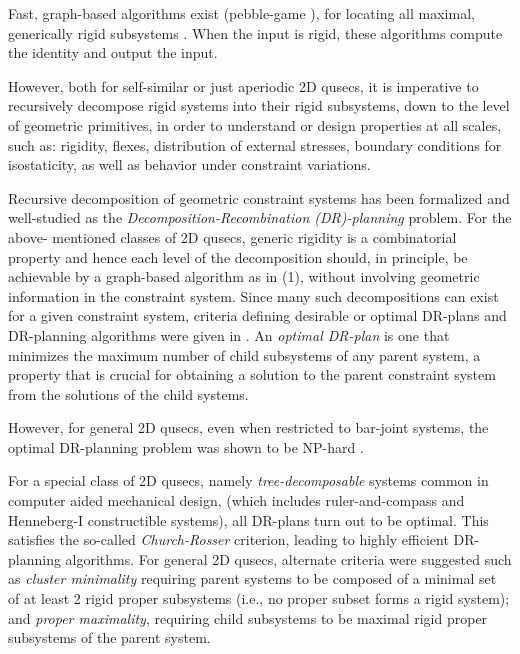 Fast, graph-based algorithms exist (pebble-game \cite{XX}), for
locating all maximal, generically rigid subsystems \cite{XX}. When the
input is rigid, these algorithms compute the identity and  output the
input.

However, both for self-similar or just aperiodic 2D qusecs, it is
imperative to recursively decompose rigid systems into their rigid
subsystems, down to the level of geometric primitives, in order to
understand or design properties at all scales, such as: rigidity,
flexes, distribution of external stresses, boundary conditions for
isostaticity, as well as behavior under constraint variations.

Recursive decomposition of geometric constraint systems has been
formalized \cite{XX} and well-studied \cite{XX} as the {\sl
Decomposition-Recombination (DR)-planning} problem. For the above-
mentioned classes of 2D qusecs, generic rigidity is a combinatorial
property and hence each level of the decomposition should, in
principle, be achievable by a graph-based algorithm as in (1), without
involving geometric information in the constraint system. Since many
such decompositions can exist for a given constraint system, criteria
defining desirable or optimal DR-plans and DR-planning algorithms were
given in \cite{XX}. An {\em optimal DR-plan} is one that minimizes the
maximum number of child subsystems of any parent system, a property
that is crucial for obtaining a solution to the parent constraint
system from the solutions of the child systems.

However, for general 2D qusecs, even when restricted to bar-joint
systems, the optimal DR-planning problem was shown to be NP-hard
\cite{XX}.

For a special class of 2D qusecs, namely  {\em tree-decomposable}
systems \cite{XX} common in computer aided mechanical design, (which
includes ruler-and-compass and Henneberg-I constructible systems), all
DR-plans turn out to be optimal. This satisfies the so-called {\em
Church-Rosser} criterion, leading to highly efficient DR-planning
algorithms. For general 2D qusecs, alternate criteria were suggested
such as {\em cluster minimality} requiring parent systems to be
composed of a minimal set of at least 2 rigid proper subsystems (i.e.,
no proper subset forms a rigid system); and {\em proper maximality},
requiring child subsystems to be maximal rigid proper subsystems of
the parent system.

